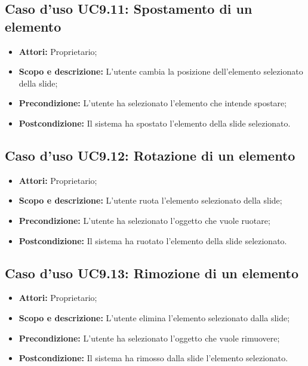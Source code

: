 \subsection{Caso d'uso UC9.11: Spostamento di un elemento}
\begin{itemize}
	\item \textbf{Attori:} Proprietario;
	\item \textbf{Scopo e descrizione:} L'utente cambia la posizione dell'elemento selezionato della \gls{slide};
	\item \textbf{Precondizione:} L'utente ha selezionato l'elemento che intende spostare;
	\item \textbf{Postcondizione:} Il sistema ha spostato l'elemento della \gls{slide} selezionato.
\end{itemize}


\subsection{Caso d'uso UC9.12: Rotazione di un elemento}
\begin{itemize}
	\item \textbf{Attori:} Proprietario;
	\item \textbf{Scopo e descrizione:} L'utente ruota l'elemento selezionato della \gls{slide};
	\item \textbf{Precondizione:} L'utente ha selezionato l'oggetto che vuole ruotare;
	\item \textbf{Postcondizione:} Il sistema ha ruotato l'elemento della \gls{slide} selezionato.
\end{itemize}


\subsection{Caso d'uso UC9.13: Rimozione di un elemento}
\begin{itemize}
	\item \textbf{Attori:} Proprietario;
	\item \textbf{Scopo e descrizione:} L'utente elimina l'elemento selezionato dalla \gls{slide};
	\item \textbf{Precondizione:} L'utente ha selezionato l'oggetto che vuole rimuovere;
	\item \textbf{Postcondizione:} Il sistema ha rimosso dalla \gls{slide} l'elemento selezionato.
\end{itemize}


